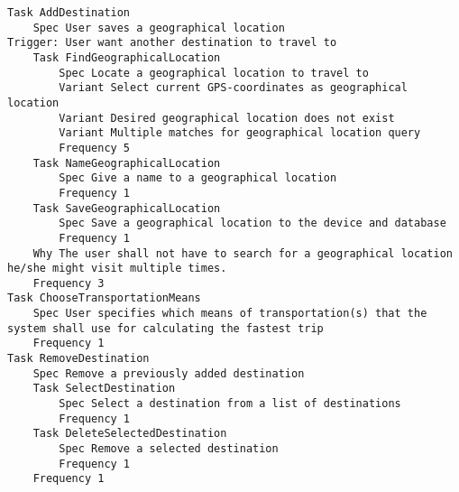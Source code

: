 

\begin{lstlisting}
Task AddDestination
	Spec User saves a geographical location
Trigger: User want another destination to travel to
	Task FindGeographicalLocation
		Spec Locate a geographical location to travel to
		Variant Select current GPS-coordinates as geographical location
		Variant Desired geographical location does not exist
		Variant Multiple matches for geographical location query
		Frequency 5
	Task NameGeographicalLocation
		Spec Give a name to a geographical location
		Frequency 1
	Task SaveGeographicalLocation
		Spec Save a geographical location to the device and database
		Frequency 1
	Why The user shall not have to search for a geographical location he/she might visit multiple times.
	Frequency 3
Task ChooseTransportationMeans
	Spec User specifies which means of transportation(s) that the system shall use for calculating the fastest trip
	Frequency 1
Task RemoveDestination
	Spec Remove a previously added destination
	Task SelectDestination
		Spec Select a destination from a list of destinations
		Frequency 1
	Task DeleteSelectedDestination
		Spec Remove a selected destination
		Frequency 1
	Frequency 1

\end{lstlisting}